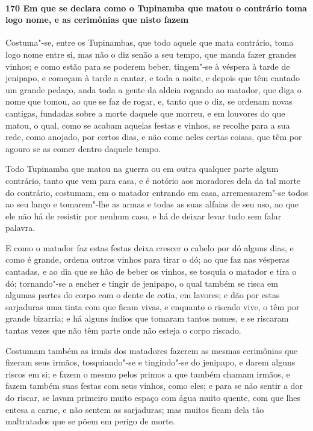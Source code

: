 \begin{linenumbers}
\paragraph{170 Em que se declara como o Tupinamba que matou o contrário toma logo nome, e
as cerimônias que nisto fazem}\quad
Costuma"-se, entre os Tupinambas, que todo aquele que mata contrário, toma logo nome entre
si, mas não o diz senão a seu tempo, que manda fazer grandes vinhos; e como estão para se
poderem beber, tingem"-se à véspera à tarde de jenipapo, e começam à tarde a cantar, e toda
a noite, e depois que têm cantado um grande pedaço, anda toda a gente da aldeia rogando ao
matador, que diga o nome que tomou, ao que se faz de rogar, e, tanto que o diz, se ordenam
novas cantigas, fundadas sobre a morte daquele que morreu, e em louvores do que matou, o
qual, como se acabam aquelas festas e vinhos, se recolhe para a sua rede, como anojado,
por certos dias, e não come neles certas coisas, que têm por agouro se as comer dentro
daquele tempo.

Todo Tupinamba que matou na guerra ou em outra qualquer parte algum contrário, tanto que
vem para casa, e é notório aos moradores dela da tal morte do contrário, costumam, em o
matador entrando em casa, arremessarem"-se todos ao seu lanço e tomarem"-lhe as armas e
todas as suas alfaias de seu uso, ao que ele não há de resistir por nenhum caso, e há de
deixar levar tudo sem falar palavra.

E como o matador faz estas festas deixa crescer o cabelo por dó alguns dias, e como é
grande, ordena outros vinhos para tirar o dó; ao que faz nas vésperas cantadas, e ao dia
que se hão de beber os vinhos, se tosquia o matador e tira o dó; tornando"-se a encher e
tingir de jenipapo, o qual também se risca em algumas partes do corpo com o dente de
cotia, em lavores; e dão por estas sarjaduras uma tinta com que ficam vivas, e enquanto o
riscado vive, o têm por grande bizarria; e há alguns índios que tomaram tantos nomes, e se
riscaram tantas vezes que não têm parte onde não esteja o corpo riscado.

Costumam também as irmãs dos matadores fazerem as mesmas cerimônias que fizeram seus
irmãos, tosquiando"-se e tingindo"-se do jenipapo, e darem alguns riscos em si; e fazem o
mesmo pelos primos a que também chamam irmãos, e fazem também suas festas com seus vinhos,
como eles; e para se não sentir a dor do riscar, se lavam primeiro muito espaço com água
muito quente, com que lhes entesa a carne, e não sentem as sarjaduras; mas muitos ficam
dela tão maltratados que se põem em perigo de morte.


\end{linenumbers}
